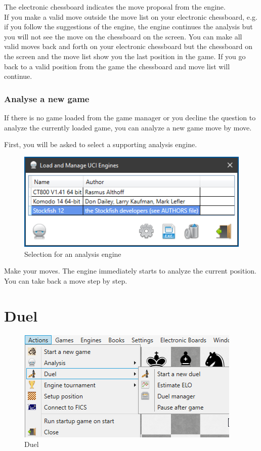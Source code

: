 \documentclass[11pt,a4paper]{article}
\begin{document}
The electronic chessboard indicates the move proposal from the engine.\\
If you make a valid move outside the move list on your electronic chessboard, e.g. if you follow the suggestions of the engine, the engine continues the analysis but you will not see the move on the chessboard on the screen. You can make all valid moves back and forth on your electronic chessboard but the chessboard on the screen and the move list show you the last position in the game. If you go back to a valid position from the game the chessboard and move list will continue.

\subsubsection{Analyse a new game} \label{AnalyzeMode22}
If there is no game loaded from the game manager or you decline the question to analyze the currently loaded game, you can analyze a new game move by move.

First, you will be asked to select a supporting analysis engine.

\begin{figure}[H]
	\centering
	\includegraphics[scale=0.9]{AnalyzeMode2.png}
	\caption{Selection for an analysis engine}
	\label{fig:AnalyzeMode2_4}
\end{figure}

Make your moves. The engine immediately starts to analyze the current position. You can take back a move step by step.

\section{Duel} \label{EngineDuel}

\begin{figure}[H]
	\centering
	\includegraphics[scale=1.0]{EngineDuel1.png}
	\caption{Duel}
	\label{fig:EngineDuel}
\end{figure}
\end{document}
